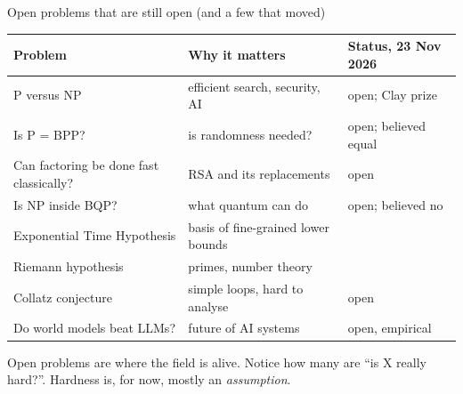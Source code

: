 \begin{frame}{Open problems that are still open (and a few that moved)}
\begin{sfig}[0.78]
\begin{tabular}{@{}L{42mm}L{52mm}L{44mm}@{}}
\toprule
\textbf{Problem} & \textbf{Why it matters} & \textbf{Status, 23 Nov 2026}\\\midrule
P versus NP & efficient search, security, AI & open; Clay prize\\
Is P = BPP? & is randomness needed? & open; believed equal\\
Can factoring be done fast classically? & RSA and its replacements & open\\
Is NP inside BQP? & what quantum can do & open; believed no\\
Exponential Time Hypothesis & basis of fine-grained lower bounds & \\
Riemann hypothesis & primes, number theory & \\
Collatz conjecture & simple loops, hard to analyse & open\\
Do world models beat LLMs? & future of AI systems & open, empirical\\\bottomrule
\end{tabular}
\end{sfig}
\vspace{1mm}
{\small Open problems are where the field is alive. Notice how many are ``is X really hard?''. Hardness is, for now, mostly an \emph{assumption}.}
\end{frame}

